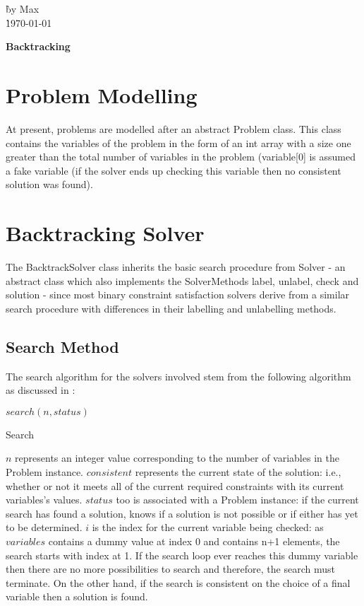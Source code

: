 \documentclass{article}
\begin{document}
\begin{tabbing}
\` by Max\\
\` \today \\
\end{tabbing}
\begin{Large}
\begin{center}
{\bf Backtracking}
\end{center}
\end{Large}
\section*{Problem Modelling}
At present, problems are modelled after an abstract Problem class. This class contains the variables of the problem in the form of an int array with a size one greater than the total number of variables in the problem (variable[0] is assumed a fake variable (if the solver ends up checking this variable then no consistent solution was found).
\section*{Backtracking Solver}
The BacktrackSolver class inherits the basic search procedure from Solver - an abstract class which also implements the SolverMethods label, unlabel, check and solution - since most binary constraint satisfaction solvers derive from a similar search procedure with differences in their labelling and unlabelling methods.
\subsection*{Search Method}
The search algorithm for the solvers involved stem from the following algorithm as discussed in \cite{Prosser93}:
\begin{algorithm}
\DontPrintSemicolon
\nl $search(n,status)$ \;
\nl {}
\caption{Search}
\label{bcSearch}
\end{algorithm}
$n$ represents an integer value corresponding to the number of variables in the Problem instance. $consistent$ represents the current state of the solution: i.e., whether or not it meets all of the current required constraints with its current variables's values. $status$ too is associated with a Problem instance: if the current search has found a solution, knows if a solution is not possible or if either has yet to be determined. $i$ is the index for the current variable being checked: as $variables$ contains a dummy value at index 0 and contains n+1 elements, the search starts with index at 1. If the search loop ever reaches this dummy variable then there are no more possibilities to search and therefore, the search must terminate. On the other hand, if the search is consistent on the choice of a final variable then a solution is found.
\end{document}
